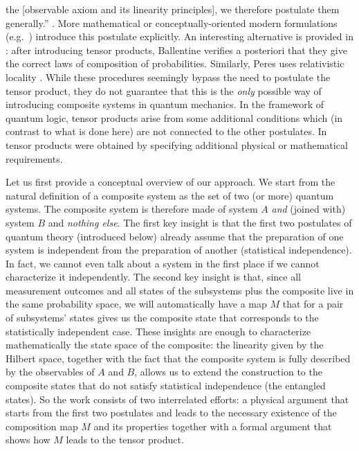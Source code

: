 \documentclass[aps,prl,amsmath,amssymb,twocolumn]{revtex4}
\theoremstyle{plain}
\theoremstyle{definition}
\theoremstyle{remark}
\def\comment#1{}
\begin{document}
the [observable axiom and its linearity principles], we therefore
postulate them generally.''  \cite{vonneumannbook}.  More mathematical
or conceptually-oriented modern formulations
(e.g.~\cite{ozawa,masanes,wootters,nielsenchuang}) introduce this
postulate explicitly.  An interesting alternative is provided in
\cite{ballentinebook,ballentinepaper}: after introducing tensor
products, Ballentine verifies a posteriori that they give the correct
laws of composition of probabilities. Similarly, Peres uses
relativistic locality \cite{peres}. While these procedures seemingly
bypass the need to postulate the tensor product, they do not guarantee
that this is the {\em only} possible way of introducing composite
systems in quantum mechanics. In the framework of quantum logic,
tensor products arise from some additional conditions \cite{matolcsi}
which (in contrast to what is done here) are not connected to the
other postulates.  In \cite{marmo,aerts} tensor products were obtained
by specifying additional physical or mathematical requirements.
\comment{ {\em Il resto della frase da spostare in supp material} In
  quantum field theory one tends to avoid problems connected with
  tensor products of infinite dimensional spaces by focusing on
  algebraic commutation structures, e.g.~\cite{giddins,roos}.  In
  particular, the recent MIP*=RE result \cite{mipre} implies that, in
  infinite dimensions, the tensor product is strictly less
  computationally powerful than the commutation structures,
  emphasizing the difference among these two structures, at least for
  the infinite-dimensional case. We will consider the non-relativistic
  setting here.}
	
Let us first provide a conceptual overview of our approach. We start from the natural definition of a composite system as the set
of two (or more) quantum systems. The composite system is therefore
made of system $A$ {\em and} (joined with) system $B$ and {\em nothing
  else}. The first key insight is that the first two postulates of
quantum theory (introduced below) already assume that the preparation
of one system is independent from the preparation of another
(statistical independence). In fact, we cannot even talk about a
system in the first place if we cannot characterize it independently.
The second key insight is that, since all measurement outcomes and all
states of the subsystems plus the composite live in the same
probability space, we will automatically have a map $M$ that for a
pair of subsystems' states gives us the composite state that
corresponds to the statistically independent case. These insights are
enough to characterize mathematically the state space of the
composite: the linearity given by the Hilbert space, together with the
fact that the composite system is fully described by the observables
of $A$ and $B$, allows us to extend the construction to the composite
states that do not satisfy statistical independence (the entangled
states). So the work consists of two interrelated efforts: a physical
argument that starts from the first two postulates and leads to the
necessary existence of the composition map $M$ and its properties
together with a formal argument that shows how $M$ leads to the tensor
product.
	
\end{document}
